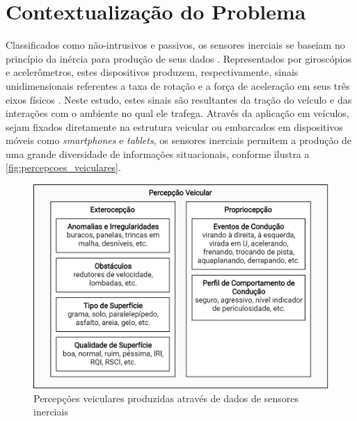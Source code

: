 \section{Contextualização do Problema}

Classificados como não-intrusivos e passivos, os sensores inerciais se baseiam no princípio da inércia para produção de seus dados \cite{Braga2017}. Representados por giroscópios e acelerômetros, estes dispositivos produzem, respectivamente, sinais unidimensionais referentes a taxa de rotação e a força de aceleração em seus três eixos físicos \cite{Groves2013}. Neste estudo, estes sinais são resultantes da tração do veículo e das interações com o ambiente no qual ele trafega. Através da aplicação em veículos, sejam fixados diretamente na estrutura veicular ou embarcados em dispositivos móveis como \textit{smartphones} e \textit{tablets}, os sensores inerciais permitem a produção de uma grande diversidade de informações situacionais, conforme ilustra a \autoref{fig:percepcoes_veiculares}.

\begin{figure}[h]
  \centering
  \caption{Percepções veiculares produzidas através de dados de sensores inerciais}
  \label{fig:percepcoes_veiculares}
  \includegraphics[width=0.9\linewidth]{figuras/fig_2.png}
\end{figure}

